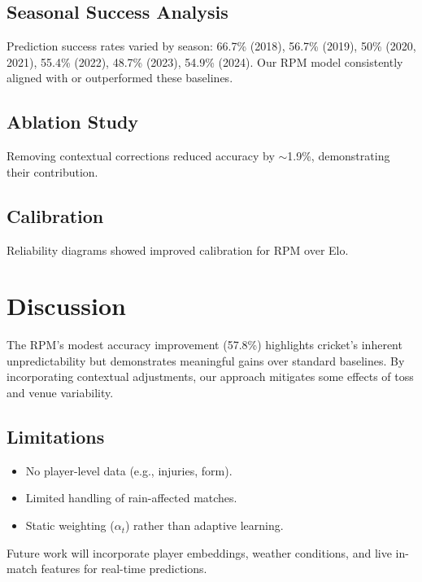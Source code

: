 \documentclass{article}
\begin{document}
\subsection{Seasonal Success Analysis}
Prediction success rates varied by season: 66.7\% (2018), 56.7\% (2019), 50\% (2020, 2021), 55.4\% (2022), 48.7\% (2023), 54.9\% (2024). Our RPM model consistently aligned with or outperformed these baselines.


\subsection{Ablation Study}
Removing contextual corrections reduced accuracy by $\sim$1.9\%, demonstrating their contribution.

\subsection{Calibration}
Reliability diagrams showed improved calibration for RPM over Elo.


\section{Discussion}
The RPM's modest accuracy improvement (57.8\%) highlights cricket's inherent unpredictability but demonstrates meaningful gains over standard baselines. By incorporating contextual adjustments, our approach mitigates some effects of toss and venue variability.

\subsection*{Limitations}
\begin{itemize}
    \item No player-level data (e.g., injuries, form).
    \item Limited handling of rain-affected matches.
    \item Static weighting ($\alpha_{t}$) rather than adaptive learning.
\end{itemize}
Future work will incorporate player embeddings, weather conditions, and live in-match features for real-time predictions.
\end{document}
